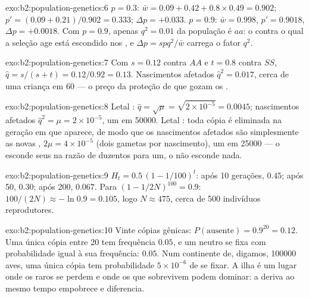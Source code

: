 \begin{solution}{exo:b2:population-genetics:6}
$p = 0.3$: $\bar w = 0.09 + 0.42 + 0.8\times 0.49 = 0.902$; $p' =
(0.09 + 0.21)/0.902 = 0.333$; $\Delta p = +0.033$. $p = 0.9$: $\bar w
= 0.998$, $p' = 0.9018$, $\Delta p = +0.0018$. Com $p = 0.9$, apenas
$q^{2} = 0.01$ da população é $aa$: o  contra o qual a seleção age
está escondido nos , e $\Delta p = spq^{2}/\bar w$
carrega o fator $q^{2}$.
\end{solution}

\begin{solution}{exo:b2:population-genetics:7}
Com $s = 0.12$ contra $AA$ e $t = 0.8$ contra $SS$, $\hat q =
s/(s + t) = 0.12/0.92 = 0.13$. Nascimentos afetados $\hat q^{2} = 0.017$,
cerca de uma criança em 60 --- o preço da proteção de que gozam os
.
\end{solution}

\begin{solution}{exo:b2:population-genetics:8}
Letal : $\hat q = \sqrt{\mu} = \sqrt{2\times 10^{-5}} =
0.0045$; nascimentos afetados $\hat q^{2} = \mu = 2\times 10^{-5}$, um em
\num{50000}. Letal : toda cópia é eliminada na geração em que
aparece, de modo que os nascimentos afetados são simplesmente as novas
, $2\mu = 4\times 10^{-5}$ (dois gametas por nascimento), um em
\num{25000} --- o  esconde seus  na razão de duzentos
para um, o  não esconde nada.
\end{solution}

\begin{solution}{exo:b2:population-genetics:9}
$H_t = 0.5\,(1 - 1/100)^{t}$: após 10 gerações, $0.45$; após 50,
$0.30$; após 200, $0.067$. Para $(1 - 1/2N)^{100} = 0.9$:
$100/(2N) \approx -\ln 0.9 = 0.105$, logo $N \approx 475$, cerca de 500
indivíduos reprodutores.
\end{solution}

\begin{solution}{exo:b2:population-genetics:10}
Vinte cópias gênicas: $P(\text{ausente}) = 0.9^{20} = 0.12$. Uma única
cópia entre 20 tem frequência $0.05$, e um  neutro se fixa com
probabilidade igual à sua frequência: $0.05$. Num continente de, digamos,
\num{100000} aves, uma única cópia tem probabilidade $5\times 10^{-6}$
de se fixar. A ilha é um lugar onde os  raros se perdem e onde os
que sobrevivem podem dominar: a deriva ao mesmo tempo empobrece e
diferencia.
\end{solution}

